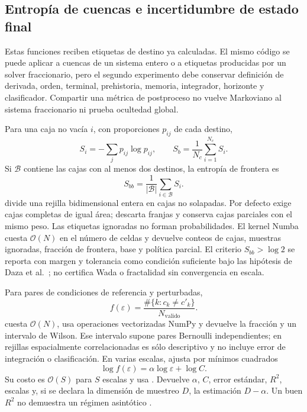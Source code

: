 \subsection{Entropía de cuencas e incertidumbre de estado final}
\label{sec:basin-entropy-uncertainty}

Estas funciones reciben etiquetas de destino ya calculadas. El mismo código se
puede aplicar a cuencas de un sistema entero o a etiquetas producidas por un
solver fraccionario, pero el segundo experimento debe conservar definición de
derivada, orden, terminal, prehistoria, memoria, integrador, horizonte y
clasificador. Compartir una métrica de postproceso no vuelve Markoviano al
sistema fraccionario ni prueba ocultedad global.

Para una caja no vacía \(i\), con proporciones \(p_{ij}\) de cada destino,
\[
 S_i=-\sum_jp_{ij}\log p_{ij},\qquad
 S_b=\frac1{N_c}\sum_{i=1}^{N_c}S_i.
\]
Si \(\mathcal B\) contiene las cajas con al menos dos destinos, la entropía de
frontera es
\[
 S_{bb}=\frac1{|\mathcal B|}\sum_{i\in\mathcal B}S_i.
\]
 divide una rejilla bidimensional entera en cajas no
solapadas. Por defecto exige cajas completas de igual área;
 descarta franjas y
 conserva cajas parciales con el mismo peso. Las
etiquetas ignoradas no forman probabilidades. El kernel Numba cuesta
\(\mathcal O(N)\)
en el número de celdas y devuelve conteos de cajas, muestras ignoradas,
fracción de frontera, base y política parcial. El criterio
\(S_{bb}>\log 2\) se reporta con margen y tolerancia como condición suficiente
bajo las hipótesis de Daza et al.~\cite{DazaEtAl2016}; no certifica Wada o
fractalidad sin convergencia en escala.

Para pares de condiciones de referencia y perturbadas,
\[
 f(\varepsilon)=
 \frac{\#\{k:c_k\ne c'_k\}}{N_{\mathrm{valido}}}.
\]
 cuesta \(\mathcal O(N)\), usa operaciones
vectorizadas NumPy y devuelve la fracción y un intervalo de Wilson. Ese
intervalo supone pares Bernoulli independientes; en
rejillas espacialmente correlacionadas es sólo descriptivo y no incluye error
de integración o clasificación. En varias escalas,
 ajusta por mínimos cuadrados
\[
 \log f(\varepsilon)=\alpha\log\varepsilon+\log C.
\]
Su costo es \(\mathcal O(S)\) para \(S\) escalas y usa
. Devuelve \(\alpha\), \(C\), error estándar,
\(R^2\), escalas y, si se declara la dimensión de muestreo \(D\), la
estimación \(D-\alpha\). Un buen \(R^2\) no demuestra un régimen asintótico
\cite{McDonaldEtAl1985}.

